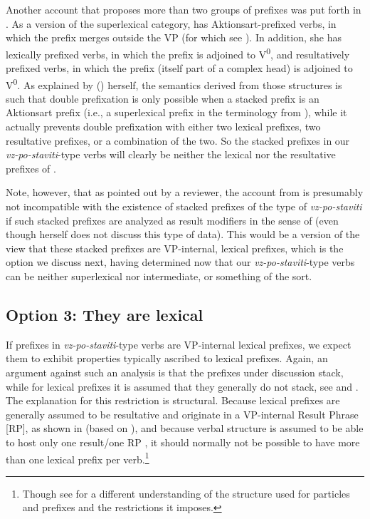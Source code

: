 \documentclass[output=paper,colorlinks,citecolor=brown]{langscibook}
\begin{document}
 Another account that proposes more than two groups of prefixes was put forth in \citet{babko2003perfectivity}. As a version of the superlexical category, \citeauthor{babko2003perfectivity} has Aktionsart-prefixed verbs, in which the prefix merges outside the VP (for which see ). In addition, she has lexically prefixed verbs, in which the prefix is adjoined to V\textsuperscript{0}, and resultatively prefixed verbs, in which the prefix (itself part of a complex head) is adjoined to V\textsuperscript{0}. As explained by \citeauthor{babko2003perfectivity} (\citeyear[27]{babko2003perfectivity}) herself, the semantics derived from those structures is such that double prefixation is only possible when a stacked prefix is an Aktionsart prefix (i.e., a superlexical prefix in the terminology from ), while it actually prevents double prefixation with either two lexical prefixes, two resultative prefixes, or a combination of the two. So the stacked prefixes in our \textit{vz-po-staviti}-type verbs will clearly be neither the lexical nor the resultative prefixes of \citet{babko2003perfectivity}.
 
 Note, however, that as pointed out by a reviewer,  the account from \citet{babko2003perfectivity} is presumably not incompatible with the existence of stacked prefixes of the type of \textit{vz-po-staviti} if such stacked prefixes are analyzed as result modifiers in the sense of \citet{zaucer2013} (even though \citeauthor{babko2003perfectivity} herself does not discuss this type of data). This would be a version of the view that these stacked prefixes are VP-internal, lexical prefixes, which is the option we discuss next, having determined now that our \textit{vz-po-staviti}-type verbs can be neither superlexical nor intermediate, or something of the sort.
 
\subsection{Option 3: They are lexical}\label{sec:theyarelexical}
 If prefixes in \textit{vz-po-staviti}-type verbs are VP-internal lexical prefixes,  we expect them to exhibit properties typically ascribed to lexical prefixes. Again, an argument against such an analysis is that the prefixes under discussion stack, while for lexical prefixes it is assumed that they generally do not stack, see  and . The explanation for this restriction is structural. Because lexical prefixes are generally assumed to be resultative and originate in a VP-internal Result Phrase [RP], as shown in  (based on \citealt[(80)]{svenonius2004slavic}), and because verbal structure is assumed to be able to host only one result/one RP \citep{rappaport2001event, ramchand2008verb}, it should normally not be possible to have more than one lexical prefix per verb.\footnote{Though see \citet{den1995particles} for a different understanding of the structure used for particles and prefixes and the restrictions it imposes.}
\end{document}
